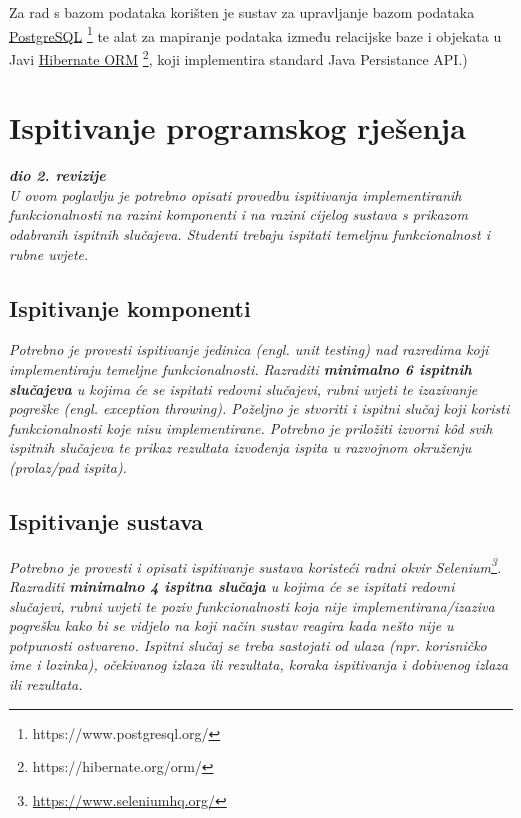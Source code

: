 			 Za rad s bazom podataka korišten je sustav za upravljanje bazom podataka \underline{PostgreSQL} \footnote{https://www.postgresql.org/} te alat za mapiranje podataka između relacijske baze i objekata u Javi \underline{Hibernate ORM} \footnote{https://hibernate.org/orm/}, koji implementira standard Java Persistance API.)
			
			
			\eject 
		
	
		\section{Ispitivanje programskog rješenja}
			
			\textbf{\textit{dio 2. revizije}}\\
			
			 \textit{U ovom poglavlju je potrebno opisati provedbu ispitivanja implementiranih funkcionalnosti na razini komponenti i na razini cijelog sustava s prikazom odabranih ispitnih slučajeva. Studenti trebaju ispitati temeljnu funkcionalnost i rubne uvjete.}
	
			
			\subsection{Ispitivanje komponenti}
			\textit{Potrebno je provesti ispitivanje jedinica (engl. unit testing) nad razredima koji implementiraju temeljne funkcionalnosti. Razraditi \textbf{minimalno 6 ispitnih slučajeva} u kojima će se ispitati redovni slučajevi, rubni uvjeti te izazivanje pogreške (engl. exception throwing). Poželjno je stvoriti i ispitni slučaj koji koristi funkcionalnosti koje nisu implementirane. Potrebno je priložiti izvorni kôd svih ispitnih slučajeva te prikaz rezultata izvođenja ispita u razvojnom okruženju (prolaz/pad ispita). }
			
			
			
			\subsection{Ispitivanje sustava}
			
			 \textit{Potrebno je provesti i opisati ispitivanje sustava koristeći radni okvir Selenium\footnote{\url{https://www.seleniumhq.org/}}. Razraditi \textbf{minimalno 4 ispitna slučaja} u kojima će se ispitati redovni slučajevi, rubni uvjeti te poziv funkcionalnosti koja nije implementirana/izaziva pogrešku kako bi se vidjelo na koji način sustav reagira kada nešto nije u potpunosti ostvareno. Ispitni slučaj se treba sastojati od ulaza (npr. korisničko ime i lozinka), očekivanog izlaza ili rezultata, koraka ispitivanja i dobivenog izlaza ili rezultata.\\ }
			 
